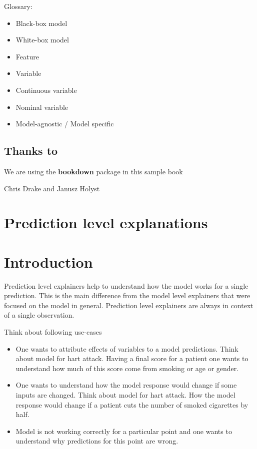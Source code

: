 \documentclass[]{book}
\providecommand{\tightlist}{%
  \setlength{\itemsep}{0pt}\setlength{\parskip}{0pt}}
\theoremstyle{definition}
\theoremstyle{definition}
\theoremstyle{definition}
\theoremstyle{remark}
\begin{document}
Glossary:

\begin{itemize}
\tightlist
\item
  Black-box model
\item
  White-box model
\item
  Feature
\item
  Variable
\item
  Continuous variable
\item
  Nominal variable
\item
  Model-agnostic / Model specific
\end{itemize}

\hypertarget{thanksto}{%
\section{Thanks to}\label{thanksto}}

We are using the \textbf{bookdown} package \citep{R-bookdown} in this
sample book

Chris Drake and Janusz Holyst

\hypertarget{prediction-level-explanations}{%
\chapter*{Prediction level
explanations}\label{prediction-level-explanations}}

\hypertarget{PredictionExplainers}{%
\chapter{Introduction}\label{PredictionExplainers}}

Prediction level explainers help to understand how the model works for a
single prediction. This is the main difference from the model level
explainers that were focused on the model in general. Prediction level
explainers are always in context of a single observation.

Think about following use-cases

\begin{itemize}
\tightlist
\item
  One wants to attribute effects of variables to a model predictions.
  Think about model for hart attack. Having a final score for a patient
  one wants to understand how much of this score come from smoking or
  age or gender.
\item
  One wants to understand how the model response would change if some
  inputs are changed. Think about model for hart attack. How the model
  response would change if a patient cuts the number of smoked
  cigarettes by half.
\item
  Model is not working correctly for a particular point and one wants to
  understand why predictions for this point are wrong.
\end{itemize}
\end{document}
